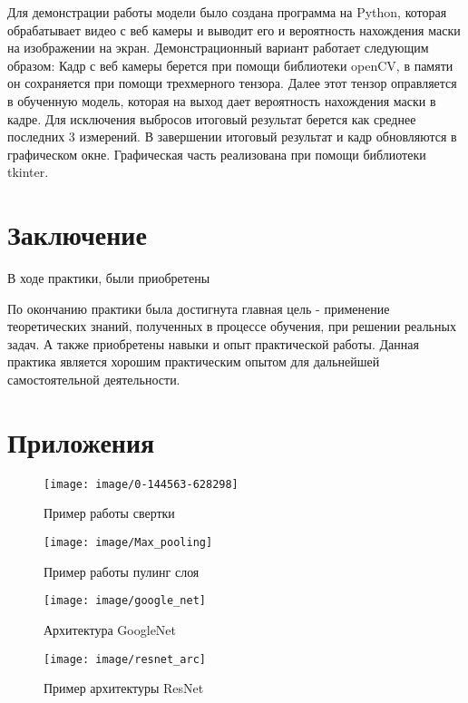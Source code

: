 \documentclass[a4paper,14pt]{article}
\begin{document}
Для демонстрации работы модели было создана программа на Python, которая обрабатывает видео с веб камеры и выводит его и вероятность нахождения маски на изображении на экран.
Демонстрационный вариант работает следующим образом:
Кадр с веб камеры берется при помощи библиотеки openCV, в памяти он сохраняется при помощи трехмерного тензора.
Далее этот тензор оправляется в обученную модель, которая на выход дает вероятность нахождения маски в кадре.
Для исключения выбросов итоговый результат берется как среднее последних 3 измерений.
В завершении итоговый результат и кадр обновляются в графическом окне.
Графическая часть реализована при помощи библиотеки tkinter.


\pagebreak
\section{Заключение}

В ходе практики, были приобретены

По окончанию практики была достигнута главная цель - применение теоретических знаний, полученных в процессе обучения, при решении реальных задач.
А также приобретены навыки и опыт практической работы.
Данная практика является хорошим практическим опытом для дальнейшей самостоятельной деятельности.

\pagebreak
\section{Приложения	}

\begin{figure}[H]
	\centering
	\texttt{[image: image/0-144563-628298]}
	\caption{Пример работы свертки}
	\label{fig:0-144563-628298}
\end{figure}

\begin{figure}[H]
	\centering
	\texttt{[image: image/Max\_pooling]}
	\caption{Пример работы пулинг слоя}
	\label{fig:maxpooling}
\end{figure}

\begin{figure}[H]
	\centering
	\texttt{[image: image/google\_net]}
	\caption{Архитектура GoogleNet}
	\label{fig:googlenet}
\end{figure}


\begin{figure}[H]
	\centering
	\texttt{[image: image/resnet\_arc]}
	\caption{Пример архитектуры ResNet}
	\label{fig:resnetarc}
\end{figure}
\end{document}
